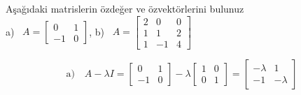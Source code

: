 \documentclass[11pt,a4paper]{article}
\begin{document}
\begin{ornek}
Aşağıdaki matrislerin özdeğer ve özvektörlerini bulunuz\\[1mm]
a) \ $A=\begin{bmatrix}0&1\\-1&0\end{bmatrix}$, \qquad b) \ $A=\begin{bmatrix}2&0&0\\1&1&2\\1&-1&4\end{bmatrix}$
\end{ornek}
\begin{cozum}
\[ \text{a)}\quad A-\lambda I=\begin{bmatrix}0&1\\-1&0\end{bmatrix}-\lambda\begin{bmatrix}1&0\\0&1\end{bmatrix}=\begin{bmatrix}-\lambda&1\\-1&-\lambda\end{bmatrix} \]


\end{cozum}
\end{document}
